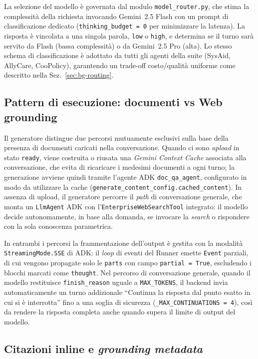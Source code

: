 La selezione del modello è governata dal modulo \texttt{model\_router.py},
che stima la complessità della richiesta invocando Gemini~2.5 Flash con un
prompt di classificazione dedicato (\texttt{thinking\_budget = 0} per
minimizzare la latenza). La risposta è vincolata a una singola parola, 
\texttt{low} o \texttt{high}, e determina se il turno sarà servito da
Flash (bassa complessità) o da Gemini~2.5 Pro (alta). Lo stesso schema di
classificazione è adottato da tutti gli agenti della suite (SysAid,
AllyCare, CooPolicy), garantendo un trade-off costo/qualità uniforme come
descritto nella Sez.~\ref{sec:bg-routing}.

\subsection{Pattern di esecuzione: documenti vs Web grounding}
\label{subsec:vera-paths}

Il generatore distingue due percorsi mutuamente esclusivi sulla base della
presenza di documenti caricati nella conversazione. Quando ci sono \emph{upload}
in stato \texttt{ready}, viene costruita o riusata una \emph{Gemini Context
Cache} associata alla conversazione, che evita di ricaricare i medesimi
documenti a ogni turno; la generazione avviene quindi tramite l'agente ADK
\texttt{doc\_qa\_agent}, configurato in modo da utilizzare la cache 
(\texttt{generate\_content\_config.cached\_content}).
In assenza di upload, il generatore percorre il \emph{path} di conversazione
generale, che monta un \texttt{LlmAgent} ADK con
l'\texttt{EnterpriseWebSearchTool} integrato: il modello decide
autonomamente, in base alla domanda, se invocare la \emph{search} o
rispondere con la sola conoscenza parametrica.

In entrambi i percorsi la frammentazione dell'output è gestita con la modalità
\texttt{StreamingMode.SSE} di ADK: il \emph{loop} di eventi del Runner emette
\texttt{Event} parziali, di cui vengono propagate solo le \texttt{parts} con
campo \texttt{partial = True}, escludendo i blocchi marcati come
\texttt{thought}. Nel percorso di conversazione generale, quando il modello
restituisce \texttt{finish\_reason} uguale a \texttt{MAX\_TOKENS}, il backend
invia automaticamente un turno addizionale ``Continua la risposta dal punto
esatto in cui si è interrotta'' fino a una soglia di sicurezza
(\texttt{\_MAX\_CONTINUATIONS = 4}), così da rendere la risposta completa
anche quando supera il limite di output del modello.

\subsection{Citazioni inline e \emph{grounding metadata}}
\label{subsec:vera-citations}

